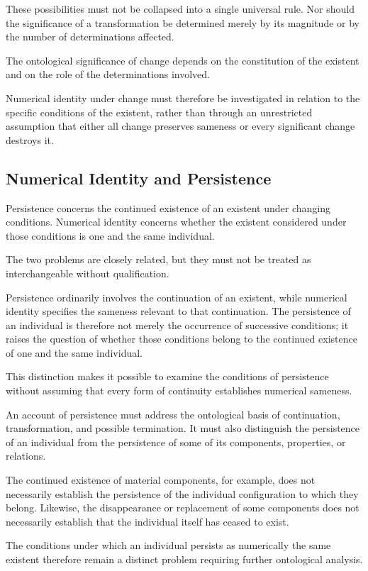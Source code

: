 These possibilities must not be collapsed
into a single universal rule. Nor should
the significance of a transformation be
determined merely by its magnitude or by
the number of determinations affected.

The ontological significance of change
depends on the constitution of the existent
and on the role of the determinations
involved.

Numerical identity under change must
therefore be investigated in relation
to the specific conditions of the existent,
rather than through an unrestricted
assumption that either all change preserves
sameness or every significant change
destroys it.

\subsection{Numerical Identity and Persistence}

Persistence concerns the continued existence
of an existent under changing conditions.
Numerical identity concerns whether the
existent considered under those conditions
is one and the same individual.

The two problems are closely related,
but they must not be treated as interchangeable
without qualification.

Persistence ordinarily involves the
continuation of an existent, while numerical
identity specifies the sameness relevant
to that continuation. The persistence
of an individual is therefore not merely
the occurrence of successive conditions;
it raises the question of whether those
conditions belong to the continued existence
of one and the same individual.

This distinction makes it possible to
examine the conditions of persistence
without assuming that every form of
continuity establishes numerical sameness.

An account of persistence must address
the ontological basis of continuation,
transformation, and possible termination.
It must also distinguish the persistence
of an individual from the persistence
of some of its components, properties,
or relations.

The continued existence of material
components, for example, does not
necessarily establish the persistence
of the individual configuration to which
they belong. Likewise, the disappearance
or replacement of some components does
not necessarily establish that the
individual itself has ceased to exist.

The conditions under which an individual
persists as numerically the same existent
therefore remain a distinct problem
requiring further ontological analysis.

